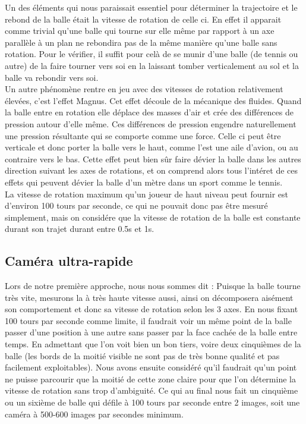 Un des éléments qui nous paraissait essentiel pour déterminer la trajectoire et le rebond de la balle était la vitesse de rotation de celle ci. En effet il apparait comme trivial qu'une balle qui tourne sur elle même par rapport à un axe parallèle à un plan ne rebondira pas de la même manière qu'une balle sans rotation. Pour le vérifier, il suffit pour celà de se munir d'une balle (de tennis ou autre) de la faire tourner vers soi en la laissant tomber verticalement au sol et la balle va rebondir vers soi.\\

Un autre phénomène rentre en jeu avec des vitesses de rotation relativement élevées, c'est l'effet Magnus. Cet effet découle de la mécanique des fluides. Quand la balle entre en rotation elle déplace des masses d'air et crée des différences de pression autour d'elle même. Ces différences de pression engendre naturellement une pression résultante qui se comporte comme une force. Celle ci peut être verticale et donc porter la balle vers le haut, comme l'est une aile d'avion, ou au contraire vers le bas. Cette effet peut bien sûr faire dévier la balle dans les autres direction suivant les axes de rotations, et on comprend alors tous l'intéret de ces effets qui peuvent dévier la balle d'un mètre dans un sport comme le tennis.\\

La vitesse de rotation maximum qu'un joueur de haut niveau peut fournir est d'environ 100 tours par seconde, ce qui ne pouvait donc pas être mesuré simplement, mais on considére que la vitesse de rotation de la balle est constante durant son trajet durant entre 0.5s et 1s.

\subsection{Caméra ultra-rapide}

Lors de notre première approche, nous nous sommes dit : Puisque la balle tourne très vite, mesurons la à très haute vitesse aussi, ainsi on décomposera aisément son comportement et donc sa vitesse de rotation selon les 3 axes. En nous fixant 100 tours par seconde comme limite, il faudrait voir un même point de la balle passer d'une position à une autre sans passer par la face cachée de la balle entre temps. En admettant que l'on voit bien un bon tiers, voire deux cinquièmes de la balle (les bords de la moitié visible ne sont pas de très bonne qualité et pas facilement exploitables). Nous avons ensuite considéré qu'il faudrait qu'un point ne puisse parcourir que la moitié de cette zone claire pour que l'on détermine la vitesse de rotation sans trop d'ambiguité. Ce qui au final nous fait un cinquième ou un sixième de balle qui défile à 100 tours par seconde entre 2 images, soit une caméra à 500-600 images par secondes minimum.\\

